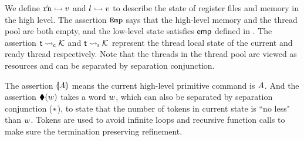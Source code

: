 We define ${\hat{\texttt{rn}}} \rightarrowtail {v}$ and ${l} \rightarrowtail {v}$
to describe the state of
register files and memory in the high level.
The assertion $\texttt{Emp}$
says that the high-level memory and the thread pool are
both empty, and the low-level state satisfies $\textsf{emp}$
defined in \Fig{\ref{fig:Semantics of Assertions}}.
The assertion ${\textsf{t}} \leadsto_{\textsf{c}} {\mathcal{K}}$
and ${\textsf{t}} \leadsto_{\textsf{r}} {\mathcal{K}}$ represent
the thread local state of the current and ready
thread respectively. Note that the threads 
in the thread pool
are viewed as resources and can be separated by
separation conjunction.

The assertion $\llparenthesis {\textit{A}} \rrparenthesis$ means the
current high-level primitive command is $\textit{A}$.
And the assertion $\blacklozenge({w})$ takes a word $w$,
which can also be separated by separation conjunction ($*$),
to state that the number of tokens in current state is
``no less" than $w$. 
Tokens are used 
to avoid infinite loops and recursive function calls 
to make sure the termination preserving refinement.

